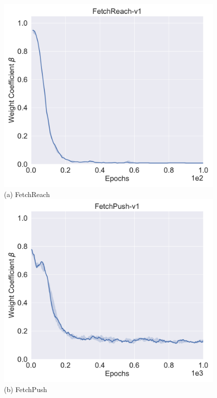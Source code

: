 \begin{figure}[H]
\centering
{}
  \centering
  \includegraphics[width=\linewidth]{figures/chapter3/reach_samples.pdf}
  ({a}) FetchReach
\endminipage
{}%
  \centering
  \includegraphics[width=\linewidth]{figures/chapter3/push_samples.pdf}
  ({b}) FetchPush
\endminipage\hfill
{}%
  \centering

\end{figure}

